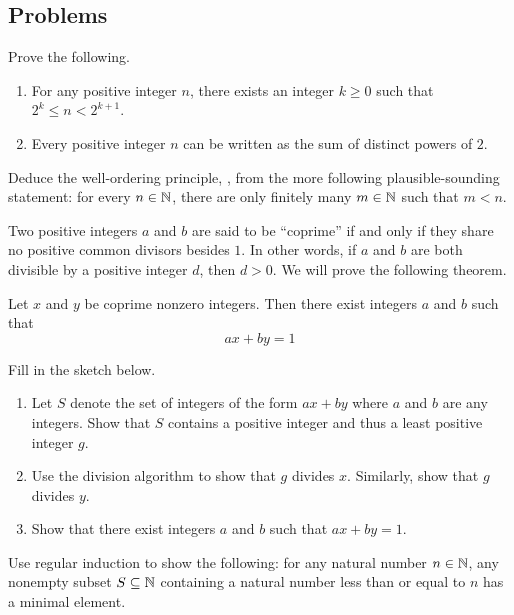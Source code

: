 \documentclass[../notes.tex]{subfiles}
\begin{document}
\subsection{Problems}
\begin{homework}
    Prove the following.
    \begin{enumerate}[label=(\alph*)]
        \item For any positive integer $n$, there exists an integer $k\ge0$ such that $2^k\le n<2^{k+1}$.
        \item Every positive integer $n$ can be written as the sum of distinct powers of $2$.
    \end{enumerate}
\end{homework}

\begin{homework}
    Deduce the well-ordering principle, , from the more following plausible-sounding statement: for every $n \in \mathbb N$, there are only finitely many $m \in \mathbb N$ such that $m < n$.
\end{homework}

\begin{homework}
    Two positive integers $a$ and $b$ are said to be ``coprime'' if and only if they share no positive common divisors besides $1$. In other words, if $a$ and $b$ are both divisible by a positive integer $d$, then $d>0$. We will prove the following theorem.
    \begin{theorem}[Bezout]
        Let $x$ and $y$ be coprime nonzero integers. Then there exist integers $a$ and $b$ such that
        \begin{equation*}
            ax + by = 1
        \end{equation*}
    \end{theorem}
    Fill in the sketch below.
    \begin{enumerate}[label=(\alph*)]
        \item Let $S$ denote the set of integers of the form $ax+by$ where $a$ and $b$ are any integers. Show that $S$ contains a positive integer and thus a least positive integer $g$.
        \item Use the division algorithm to show that $g$ divides $x$. Similarly, show that $g$ divides $y$.
        \item Show that there exist integers $a$ and $b$ such that $ax+by=1$.
    \end{enumerate}
\end{homework}

\begin{homework}
    Use regular induction to show the following: for any natural number $n\in\mathbb N$, any nonempty subset $S\subseteq\mathbb N$ containing a natural number less than or equal to $n$ has a minimal element.
\end{homework}
\end{document}
